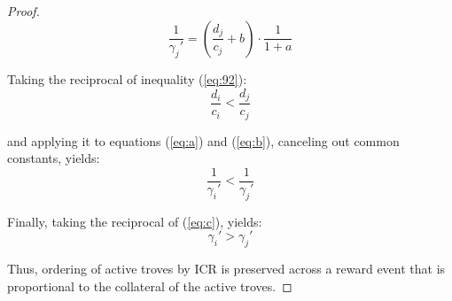 \documentclass[reqno]{article}
\begin{document}
\begin{proof}
\begin{equation} \label{eq:b}
  \frac{1}{\gamma_j'} = \left(\frac{d_j}{c_j}+b\right) \cdot \frac{1}{1 + a}  
\end{equation}

Taking the reciprocal of inequality (\ref{eq:92}):
\begin{equation}
  \frac{d_i}{c_i} < \frac{d_j}{c_j}
\end{equation}

and applying it to equations (\ref{eq:a}) and (\ref{eq:b}), canceling out common constants, yields:
\begin{equation} \label{eq:c}
  \frac{1}{\gamma_i'} < \frac{1}{\gamma_j'}
\end{equation}

Finally, taking the reciprocal of (\ref{eq:c}), yields:
\begin{equation}
  \gamma_i' > \gamma_j'
\end{equation}

Thus, ordering of active troves by ICR is preserved across a reward event that is proportional to the collateral of the active troves.
\end{proof}
\end{document}
